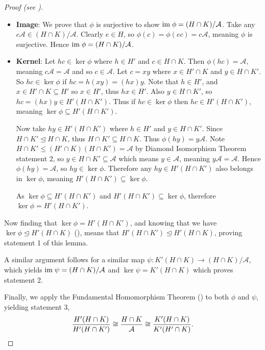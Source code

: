 \begin{proof}[Proof (see {\cite[Lemma I.8.9]{hungerford_1980}})]
\begin{itemize}
        \item \textbf{Image}: We prove that $\phi$ is surjective to show $\mathrm{im}\; \phi = (H\cap K)/\mathcal{A}$. Take any $c\mathcal{A} \in (H\cap K) / \mathcal{A}$. Clearly $e \in H$, so $\phi(c) = \phi(ec) = c\mathcal{A}$, meaning $\phi$ is surjective. Hence $\mathrm{im}\; \phi = (H\cap K)/\mathcal{A}$.
        
        \item \textbf{Kernel}: Let $hc \in \ker\phi$ where $h \in H'$ and $c \in H \cap K$. Then $\phi(hc) = \mathcal{A}$, meaning $c\mathcal{A} = \mathcal{A}$ and so $c \in \mathcal{A}$. Let $c = xy$ where $x \in H'\cap K$ and $y \in H \cap K'$. So $hc \in \ker\phi$ if $hc = h(xy) = (hx)y$. Note that $h \in H'$, and $x \in H' \cap K \subseteq H'$ so $x \in H'$, thus $hx \in H'$. Also $y \in H \cap K'$, so $hc = (hx)y \in H'(H \cap K')$. Thus if $hc \in \ker\phi$ then $hc \in H'(H \cap K')$, meaning $\ker\phi \subseteq H'(H \cap K')$.
        
        Now take $hy \in H'(H \cap K')$ where $h \in H'$ and $y \in H \cap K'$. Since $H \cap K' \unlhd H \cap K$, thus $H \cap K' \subseteq H \cap K$. Thus $\phi(hy) = y\mathcal{A}$. Note $H \cap K' \leq (H' \cap K)(H \cap K') = \mathcal{A}$ by Diamond Isomorphism Theorem statement 2, so $y \in H \cap K' \subseteq \mathcal{A}$ which means $y \in \mathcal{A}$, meaning $y\mathcal{A} = \mathcal{A}$. Hence $\phi(hy) = \mathcal{A}$, so $hy \in \ker\phi$. Therefore any $hy \in H'(H \cap K')$ also belongs in $\ker\phi$, meaning $H'(H \cap K') \subseteq \ker\phi$.
        
        As $\ker\phi \subseteq H'(H\cap K')$ and $H'(H\cap K') \subseteq \ker\phi$, therefore $\ker\phi = H'(H \cap K')$.
    \end{itemize}
    
    Now finding that $\ker\phi = H'(H \cap K')$, and knowing that we have $\ker\phi \unlhd H'(H\cap K)$ (), means that $H'(H \cap K') \unlhd H'(H\cap K)$, proving statement 1 of this lemma.
    
    A similar argument follows for a similar map $\psi: K'(H\cap K) \to (H\cap K)/\mathcal{A}$, which yields $\mathrm{im}\;\psi = (H\cap K)/\mathcal{A}$ and $\ker\psi = K'(H\cap K)$ which proves statement 2.
    
    Finally, we apply the Fundamental Homomorphism Theorem () to both $\phi$ and $\psi$, yielding statement 3,
    \[
        \frac{H'(H\cap K)}{H'(H\cap K')} \cong \frac{H\cap K}{\mathcal{A}} \cong \frac{K'(H\cap K)}{K'(H'\cap K)}.\qedhere
    \]
\end{proof}

